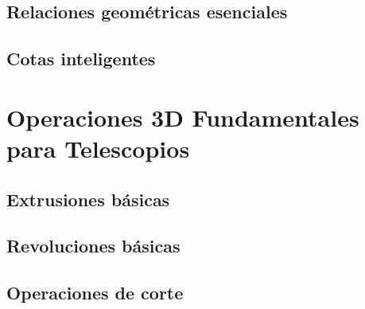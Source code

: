 \subsection{Relaciones geométricas esenciales}

\subsection{Cotas inteligentes}


\section{Operaciones 3D Fundamentales para Telescopios}

\subsection{Extrusiones básicas}

\subsection{Revoluciones básicas}

\subsection{Operaciones de corte}

